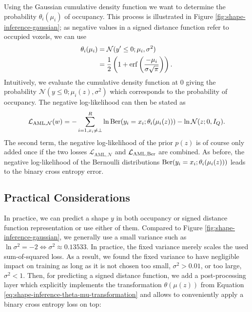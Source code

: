 Using the Gaussian cumulative density function we want to determine the
probability $\theta_i(\mu_i)$ of occupancy.
This process is illustrated in Figure \ref{fig:shape-inference-gaussian};
as negative values in a signed distance function refer to occupied voxels,
we can use
\begin{align}
  \theta_i(\mu_i) &= \mathcal{N}(y' \leq 0; \mu_i, \sigma^2)\\
  &=\frac{1}{2}\left(1 + \mathrm{erf}\left(\frac{- \mu_i}{\sigma \sqrt{\pi}}\right)\right).
  \label{eq:shape-inference-theta-mu-transformation}
\end{align}
Intuitively, we evaluate the cumulative density function at $0$ giving the probability
$\mathcal{N}(y \leq 0; \mu_i(z), \sigma^2)$ which corresponds to the probability of
occupancy. The negative log-likelihood can then be stated as
\begin{align}
  \mathcal{L}_{\text{AML},\mathcal{N}}(w) = - \sum_{i = 1,x_i \neq \bot}^R \ln \mathrm{Ber}(y_i = x_i; \theta_i(\mu_i(z))) - \ln \mathcal{N}(z;0,I_Q).
\end{align}
The second term, the negative log-likelihood of the prior $p(z)$ is of course only
added once if the two losses $\mathcal{L}_{\text{AML},\mathcal{N}}$ and
$\mathcal{L}_{\text{AML},\mathrm{Ber}}$ are combined. As before, the negative log-likelihood
of the Bernoulli distributions $\mathrm{Ber}(y_i = x_i; \theta_i(\mu_i(z)))$ leads to the
binary cross entropy error.

\subsection{Practical Considerations}

In practice, we can predict a shape $y$ in both occupancy or signed
distance function representation or use either of them. Compared to
Figure \ref{fig:shape-inference-gaussian}, we generally use a small
variance such as $\ln \sigma^2 = -2 \Leftrightarrow \sigma^2 \approx 0.13533$.
In practice, the fixed variance merely scales the used sum-of-squared loss.
As a result, we found the fixed variance to have negligible impact on training
as long as it is not chosen too small, \eg $\sigma^2 > 0.01$, or too large,
\eg $\sigma^2 < 1$.
Then, for predicting a signed distance function, we add a post-processing layer
which explicitly implements the transformation $\theta(\mu(z))$ from
Equation \eqref{eq:shape-inference-theta-mu-transformation} and allows to
conveniently apply a binary cross entropy loss on top:

